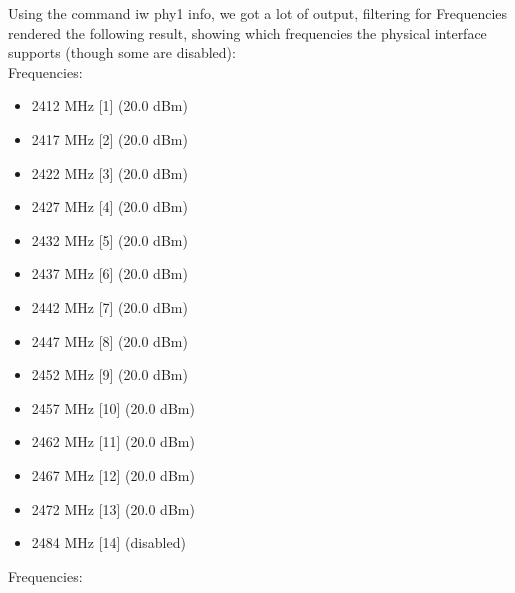 Using the command iw phy1 info, we got a lot of output, filtering for Frequencies rendered the following result, showing which frequencies the physical interface supports (though some are disabled):\\
Frequencies:\\
\begin{itemize}
\item 2412 MHz [1] (20.0 dBm)
\item 2417 MHz [2] (20.0 dBm)
\item 2422 MHz [3] (20.0 dBm)
\item 2427 MHz [4] (20.0 dBm)
\item 2432 MHz [5] (20.0 dBm)
\item 2437 MHz [6] (20.0 dBm)
\item 2442 MHz [7] (20.0 dBm)
\item 2447 MHz [8] (20.0 dBm)
\item 2452 MHz [9] (20.0 dBm)
\item 2457 MHz [10] (20.0 dBm)
\item 2462 MHz [11] (20.0 dBm)
\item 2467 MHz [12] (20.0 dBm)
\item 2472 MHz [13] (20.0 dBm)
\item 2484 MHz [14] (disabled)
\end{itemize}
Frequencies:\\
